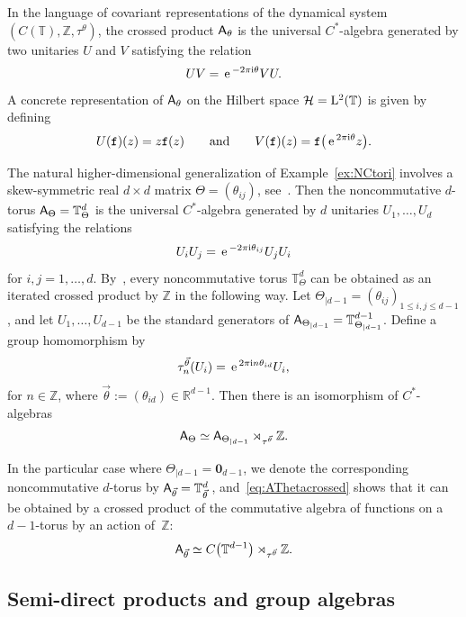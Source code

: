 \documentclass[pdftex]{sigma}
\numberwithin{equation}{section}
\newcommand{\Z}{\zed}
\newcommand{\mbf}[1]{{\boldsymbol {#1} }}
\def\ii{{{\rm i}}}
\def\A{{\sf A}}
\newcommand{\Aut}{\operatorname{Aut}}
\newcommand{\R}{\real}
\newcommand{\zed}{{\mathbb Z}} %
\newcommand{\real}{{\mathbb R}} %
\newcommand{\torus}{{\mathbb T}} %
\def\hil{{\mathcal H}}
\def\e{{\,\rm e}\,}
\begin{document}
\begin{Example}
In the language of covariant representations of the dynamical system
$(C(\torus),\Z,\tau^\theta)$, the crossed product $\A_\theta$ is the
universal $C^*$-algebra generated by two unitaries $U$ and $V$
satisfying the relation~\cite[Proposition~2.56]{Williams2007}
\begin{gather}\label{eq:C*UV}
U V=\e^{-2\pi\ii \theta} V U .
\end{gather}
A concrete representation
of $\A_\theta$ on the Hilbert space $\hil = {\rm L}^2(\torus)$ is
given by defining
\[
U(\mathtt{f})(z)=z \mathtt{f}(z) \qquad \mbox{and} \qquad V(\mathtt{f})(z) =
\mathtt{f}\big(\e^{2\pi\ii\theta} z\big) .
\]
\end{Example}

\begin{Example}[{{\bf Noncommutative $\mbf{d}$-tori}}]
\label{ex:NCtorid}
The natural higher-dimensional generalization of
Example~\ref{ex:NCtori} involves a skew-symmetric real $d{\times}d$
matrix $\Theta=(\theta_{ij})$, see~\cite{Rieffel1990}. Then the noncommutative $d$-torus
$\A_\Theta=\torus_\Theta^d$ is the universal $C^*$-algebra generated
by $d$ unitaries $U_1,\dots,U_d$ satisfying the relations
\[
U_i U_j = \e^{-2\pi\ii\theta_{ij}} U_j U_i
\]
for $i,j=1,\dots,d$. By~\cite[Lemma~1.5]{Phillips2006}, every
noncommutative torus $\torus_\Theta^d$ can be obtained as an iterated
crossed product by $\Z$ in the following way. Let
$\Theta_{|d-1}=(\theta_{ij})_{1\leq i,j\leq d-1}$, and let
$U_1,\dots,U_{d-1}$ be the standard generators of
$\A_{\Theta_{|d-1}}=\torus^{d-1}_{\Theta_{|d-1}}$. Define a
group homomorphism
\smash{$\tau^{\vec\theta}\colon \Z\to\Aut(\A_{\Theta_{|d-1}})$} by
\[
\tau_n^{\vec\theta}(U_i) = \e^{2\pi\ii n \theta_{id}} U_i
 ,
\]
for $n\in\Z$, where $\vec\theta:=(\theta_{id})\in\R^{d-1}$.
Then there is an isomorphism of $C^*$-algebras
\begin{gather}\label{eq:AThetacrossed}
\A_\Theta\simeq\A_{\Theta_{|d-1}}
\rtimes_{\tau^{\vec\theta}} \Z .
\end{gather}

In the particular case where $\Theta_{|d-1}=\mbf 0_{d-1}$, we denote the
corresponding noncommutative $d$-torus by
$\A_{\vec\theta}=\torus_{\vec\theta}^d\,$, and~\eqref{eq:AThetacrossed}
shows that it can be obtained by a crossed product of the commutative
algebra of functions on a $d{-}1$-torus by an action of~$\Z$:
\[
\A_{\vec\theta} \simeq C\big(\torus^{d-1}\big)\rtimes_{\tau^{\vec\theta}}\Z .
\]
\end{Example}

\subsection{Semi-direct products and group algebras}\label{sec:semidirect}
\end{document}
